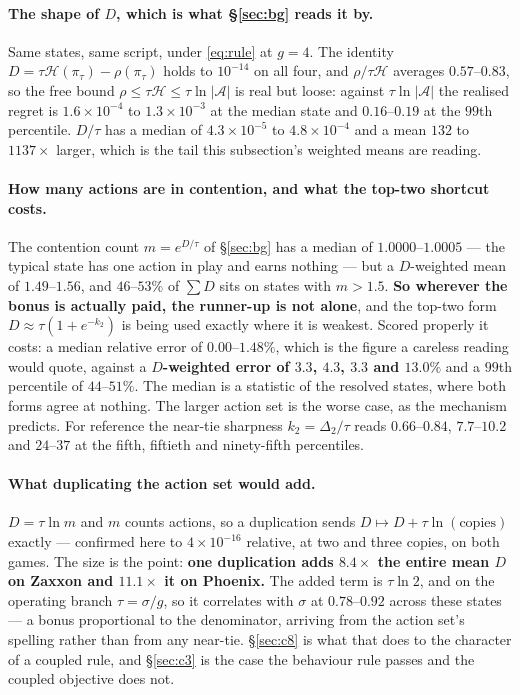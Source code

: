 \documentclass{article}
\newcommand{\actions}{\mathcal{A}}
\newcommand{\h}{\mathcal{H}}
\newcommand{\gap}{\Delta}
\newcommand{\srank}{\sigma}
\begin{document}
\paragraph{The shape of $D$, which is what \S\ref{sec:bg} reads it by.} Same states, same script,
under \eqref{eq:rule} at $g = 4$. The identity $D = \tau\h(\pi_\tau) - \rho(\pi_\tau)$ holds to
$10^{-14}$ on all four, and $\rho/\tau\h$ averages $0.57$--$0.83$, so the free bound
$\rho \le \tau\h \le \tau\ln|\actions|$ is real but loose: against $\tau\ln|\actions|$ the realised
regret is $1.6\times10^{-4}$ to $1.3\times10^{-3}$ at the median state and $0.16$--$0.19$ at the
$99$th percentile. $D/\tau$ has a median of $4.3\times10^{-5}$ to $4.8\times10^{-4}$ and a mean
$132$ to $1137\times$ larger, which is the tail this subsection's weighted means are reading.

\paragraph{How many actions are in contention, and what the top-two shortcut costs.} The
contention count $m = e^{D/\tau}$ of \S\ref{sec:bg} has a median of $1.0000$--$1.0005$ --- the
typical state has one action in play and earns nothing --- but a $D$-weighted mean of
$1.49$--$1.56$, and $46$--$53\%$ of $\sum D$ sits on states with $m > 1.5$. \textbf{So wherever
the bonus is actually paid, the runner-up is not alone}, and the top-two form
$D \approx \tau(1 + e^{-k_2})$ is being used exactly where it is weakest. Scored properly it
costs: a median relative error of $0.00$--$1.48\%$, which is the figure a careless reading would
quote, against a \textbf{$D$-weighted error of $3.3$, $4.3$, $3.3$ and $13.0\%$} and a $99$th
percentile of $44$--$51\%$. The median is a statistic of the resolved states, where both forms
agree at nothing. The larger action set is the worse case, as the mechanism predicts. For
reference the near-tie sharpness $k_2 = \gap_2/\tau$ reads $0.66$--$0.84$, $7.7$--$10.2$ and
$24$--$37$ at the fifth, fiftieth and ninety-fifth percentiles.

\paragraph{What duplicating the action set would add.} $D = \tau\ln m$ and $m$ counts actions, so
a duplication sends $D \mapsto D + \tau\ln(\text{copies})$ exactly --- confirmed here to
$4\times10^{-16}$ relative, at two and three copies, on both games. The size is the point:
\textbf{one duplication adds $8.4\times$ the entire mean $D$ on Zaxxon and $11.1\times$ it on
Phoenix.} The added term is $\tau\ln 2$, and on the operating branch $\tau = \srank/g$, so it
correlates with $\srank$ at $0.78$--$0.92$ across these states --- a bonus proportional to the
denominator, arriving from the action set's spelling rather than from any near-tie.
\S\ref{sec:c8} is what that does to the character of a coupled rule, and \S\ref{sec:c3} is the
case the behaviour rule passes and the coupled objective does not.
\end{document}
